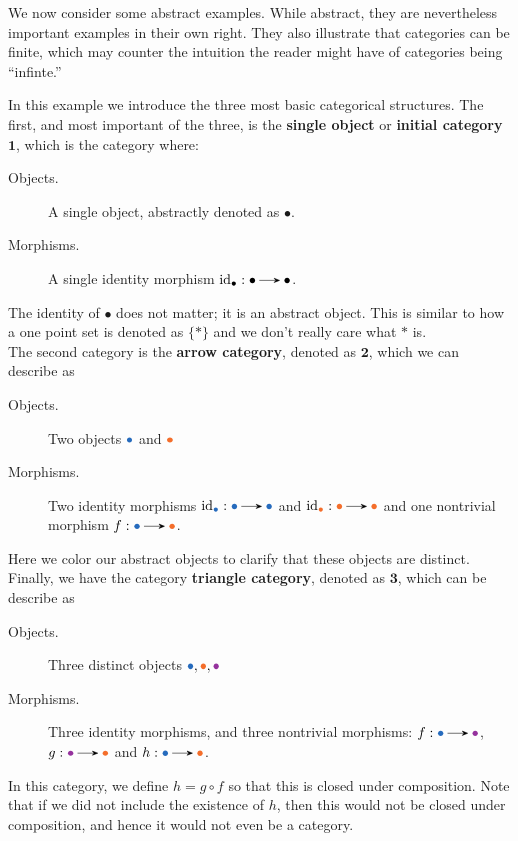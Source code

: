     We now consider some abstract examples. While abstract, they are nevertheless important 
    examples in their own right. They also illustrate that categories can be finite, 
    which may counter the intuition the reader might have of categories being ``infinte.''

    \begin{example}
        In this example we introduce the three most basic categorical structures. 
        The first, and most important of the three, is the \textbf{single object} or \textbf{initial category}
        $\bm{1}$, which is the category where: 
        \begin{description}
            \item[Objects.] A single object, abstractly denoted as $\bullet$.
            \item[Morphisms.] A single identity morphism $\id_{\bullet}: \bullet \to \bullet$. 
        \end{description}
        The identity of $\bullet$ does not matter; it is an abstract object. This is similar to how 
        a one point set is denoted as $\{*\}$ and we don't really care what $*$ is. 
        \\

        The second category is the \textbf{arrow category}, denoted as $\bm{2}$, which we can 
        describe as 
        \begin{description}
            \item[Objects.] Two objects $\textcolor{NavyBlue}{\bullet}$
            and $\textcolor{Orange}{\bullet}$
            \item[Morphisms.] Two identity morphisms $\id_{\textcolor{NavyBlue}{\bullet}}: \textcolor{NavyBlue}{\bullet}  \to \textcolor{NavyBlue}{\bullet} $ 
            and $\id_{\textcolor{Orange}{\bullet} }: \textcolor{Orange}{\bullet}  \to \textcolor{Orange}{\bullet}$ and one 
            nontrivial morphism $f: \textcolor{NavyBlue}{\bullet} \to \textcolor{Orange}{\bullet}$. 
        \end{description}
        Here we color our abstract objects to clarify that these objects are distinct.
        \\ 
        Finally, we have the category \textbf{triangle category}, denoted as $\bm{3}$, which 
        can be describe as 
        \begin{description}
            \item[Objects.] Three distinct objects $\textcolor{NavyBlue}{\bullet}, \textcolor{Orange}{\bullet}, \textcolor{Purple}{\bullet}$ 
            \item[Morphisms.] Three identity morphisms, and three nontrivial morphisms: 
            $f: \textcolor{NavyBlue}{\bullet} \to \textcolor{Purple}{\bullet}$, 
            $g: \textcolor{Purple}{\bullet} \to \textcolor{Orange}{\bullet}$ and $h: \textcolor{NavyBlue}{\bullet} \to \textcolor{Orange}{\bullet}$.
        \end{description}
        In this category, we define $h = g \circ f$ so that this is closed under composition. Note that 
        if we did not include the existence of $h$, then this would not be closed under composition, 
        and hence it would not even be a category.


\end{example}
